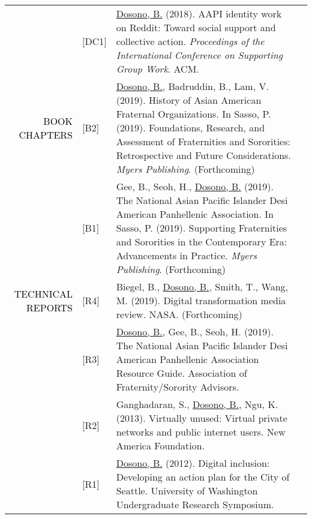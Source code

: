 \documentclass[12pt]{article}
\begin{document}
{{\begin{longtable}{Rp{1.0in}p{0.25in}p{4.75in}}
& \footnotesize{[DC1]} & \href{https://dl.acm.org/authorize?N42808}{{Dosono, B.}} (2018). AAPI identity work on Reddit: Toward social support and collective action. \textit{Proceedings of the International Conference on Supporting Group Work}. ACM. \\

\textcolor{black}{\footnotesize{\uppercase{Book Chapters}}} 

& \footnotesize{[B2]} & \href{https://myersedpress.presswarehouse.com/browse/book/9781975500320/Fraternities-and-Sororities-in-the-Contemporary-Era}{{Dosono, B.}}, Badruddin, B., Lam, V. (2019). History of Asian American Fraternal Organizations. In Sasso, P. (2019). Foundations, Research, and Assessment of Fraternities and Sororities: Retrospective and Future Considerations. \textit{Myers Publishing}. (Forthcoming) \\

& \footnotesize{[B1]} & Gee, B., Seoh, H., \href{https://myersedpress.presswarehouse.com/browse/book/9781975500320/Fraternities-and-Sororities-in-the-Contemporary-Era}{{Dosono, B.}} (2019). The National Asian Pacific Islander Desi American Panhellenic Association. In Sasso, P. (2019). Supporting Fraternities and Sororities in the Contemporary Era: Advancements in Practice. \textit{Myers Publishing}. (Forthcoming) \\

\textcolor{black}{\footnotesize{\uppercase{Technical Reports}}}
& \footnotesize{[R4]} & Biegel, B., \href{https://www.nasa.gov/digitalstrategy}{{Dosono, B.}}, Smith, T., Wang, M. (2019). Digital transformation media review. NASA. (Forthcoming) \\

& \footnotesize{[R3]} & \href{https://cdn.ymaws.com/www.afa1976.org/resource/resmgr/guides/afa-2019-resourceguide-napa-.pdf}{{Dosono, B.}}, Gee, B., Seoh, H. (2019). The National Asian Pacific Islander Desi American Panhellenic Association Resource Guide. Association of Fraternity/Sorority Advisors. \\

& \footnotesize{[R2]} & Ganghadaran, S., \href{https://www.newamerica.org/oti/policy-papers/virtually-unused/}{{Dosono, B.}}, Ngu, K. (2013). Virtually unused: Virtual private networks and public internet users. New America Foundation. \\

& \footnotesize{[R1]} & \href{http://youtu.be/Xob0hWqZQgU}{{Dosono, B.}} (2012). Digital inclusion: Developing an action plan for the City of Seattle. University of Washington Undergraduate Research Symposium. \\


\end{longtable}}}
\end{document}
